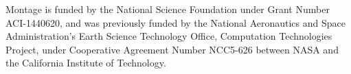 \documentclass[../main.tex]{subfiles}
\begin{document}
\label{sec:acknowledgements}
Montage is funded by the National Science Foundation under Grant Number ACI-1440620, and was previously funded by the National Aeronautics and Space Administration's Earth Science Technology Office, Computation Technologies Project, under Cooperative Agreement Number NCC5-626 between NASA and the California Institute of Technology.

\end{document}
